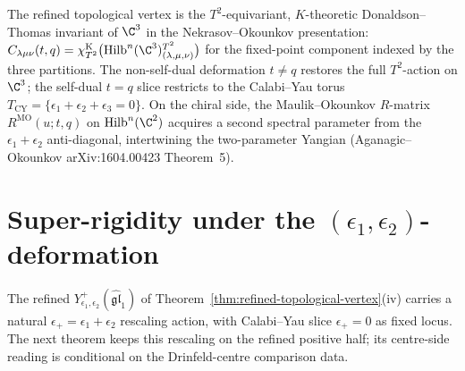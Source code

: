 \begin{remark}
\label{rem:refined-vertex-equivariant-k-dt}
The refined topological vertex is the $T^{2}$-equivariant,
$K$-theoretic Donaldson--Thomas invariant of $\C^{3}$ in the
Nekrasov--Okounkov presentation: $C_{\lambda \mu \nu}(t, q) =
\chi^{\mathrm{K}}_{T^2}\bigl(\mathrm{Hilb}^n(\C^3)^{T^2}_{(\lambda,
\mu, \nu)}\bigr)$ for the fixed-point component indexed by the three
partitions. The non-self-dual deformation $t \neq q$ restores the
full $T^{2}$-action on $\C^{3}$; the self-dual $t = q$ slice restricts
to the Calabi--Yau torus $T_{\mathrm{CY}} = \{\epsilon_1 + \epsilon_2
+ \epsilon_3 = 0\}$. On the chiral side, the Maulik--Okounkov
$R$-matrix $R^{\mathrm{MO}}(u; t, q)$ on $\mathrm{Hilb}^n(\C^2)$
acquires a second spectral parameter from the $\epsilon_1 +
\epsilon_2$ anti-diagonal, intertwining the two-parameter Yangian
(Aganagic--Okounkov \textup{arXiv:1604.00423} Theorem~5).
\end{remark}

\section{Super-rigidity under the \texorpdfstring{$(\epsilon_1, \epsilon_2)$}{(epsilon-1, epsilon-2)}-deformation}
\label{sec:super-rigidity-epsilon}

The refined $Y^{+}_{\epsilon_1, \epsilon_2}(\widehat{\mathfrak{gl}}_1)$
of Theorem~\ref{thm:refined-topological-vertex}(iv) carries a natural
$\epsilon_+ = \epsilon_1 + \epsilon_2$ rescaling action, with
Calabi--Yau slice $\epsilon_+ = 0$ as fixed locus. The next theorem
keeps this rescaling on the refined positive half; its centre-side
reading is conditional on the Drinfeld-centre comparison data.

